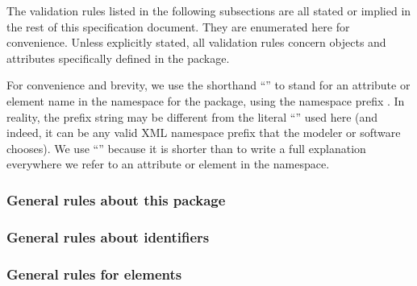 The validation rules listed in the following subsections are all stated
or implied in the rest of this specification document. They are
enumerated here for convenience. Unless explicitly stated, all
validation rules concern objects and attributes specifically defined in
the \TestTSBXMLLibraryPackage package.

For \notice convenience and brevity, we use the shorthand
``'' to stand for an attribute or element name  in
the namespace for the \TestTSBXMLLibraryPackage package, using the
namespace prefix \token{}. In reality, the prefix string may be
different from the literal ``\token{}'' used here (and indeed, it can be
any valid XML namespace prefix that the modeler or software chooses). We
use ``'' because it is shorter than to write a full
explanation everywhere we refer to an attribute or element in the
\TestTSBXMLLibraryPackage namespace.

\subsubsection*{General rules about this package}



\subsubsection*{General rules about identifiers}


\subsubsection*{General rules for \TestAnnotation elements}


